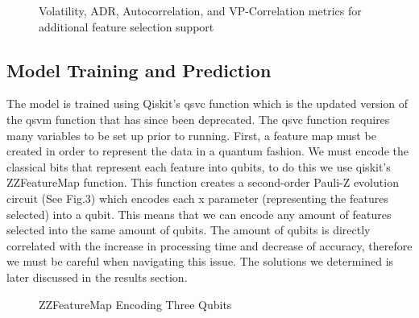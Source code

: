\documentclass{article}
\begin{document}
\begin{figure}[H]
    \centering
    \caption{Volatility, ADR, Autocorrelation, and VP-Correlation metrics for additional feature selection support}
    \label{fig:2}
\end{figure}
\subsection*{Model Training and Prediction}
The model is trained using Qiskit's \gls{qsvc} function which is the updated version of the \gls{qsvm} function that has since been deprecated. The \gls{qsvc} function requires many variables to be set up prior to running. First, a feature map must be created in order to represent the data in a quantum fashion. We must encode the classical bits that represent each feature into qubits, to do this we use qiskit's ZZFeatureMap function. This function creates a second-order Pauli-Z evolution circuit (See Fig.3) which encodes each x parameter (representing the features selected) into a qubit. This means that we can encode any amount of features selected into the same amount of qubits. The amount of qubits is directly correlated with the increase in processing time and decrease of accuracy, therefore we must be careful when navigating this issue. 
The solutions we determined is later discussed in the results section. 
\begin{figure}[H]
    \centering
    \caption{ZZFeatureMap Encoding Three Qubits}
    \label{fig:3}
\end{figure}
\end{document}
